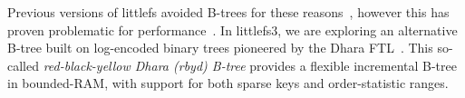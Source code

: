 \documentclass[letterpaper,twocolumn,10pt]{article}
\def\lfs+{littlefs}
\def\lfsiii+{avianfs}
\def\lfsiii+{littlefs3}
\begin{document}

Previous versions of \lfs+ avoided B-trees for these reasons~\cite{littlefs2},
however this has proven problematic for performance~\cite{li-r-27}.
In \lfsiii+, we are exploring an alternative B-tree
built on
log-encoded binary trees pioneered by the Dhara FTL~\cite{dhara}.
This so-called
\emph{red-black-yellow Dhara (rbyd) B-tree}
provides a
flexible incremental B-tree in bounded-RAM,
with support for both sparse keys and order-statistic ranges.
\end{document}
